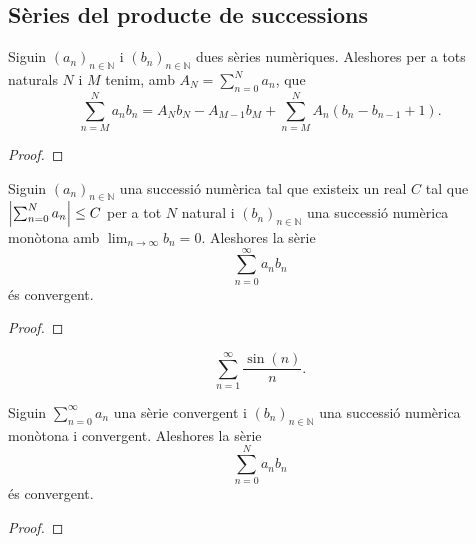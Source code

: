 \documentclass[../Apunts.tex]{subfiles}
\begin{document}
	\subsection{Sèries del producte de successions}
	\begin{lemma}
		\label{lema:fórmula de sumació d'Abel}
		Siguin \((a_{n})_{n\in\mathbb{N}}\) i \((b_{n})_{n\in\mathbb{N}}\) dues sèries numèriques. Aleshores per a tots naturals \(N\) i \(M\) tenim, amb \(A_{N}=\sum_{n=0}^{N}a_{n}\), que
		\[\sum_{n=M}^{N}a_{n}b_{n}=A_{N}b_{N}-A_{M-1}b_{M}+\sum_{n=M}^{N}A_{n}(b_{n}-b_{n-1}+1).\]
		\begin{proof}
		\end{proof}
	\end{lemma}
	\begin{theorem}
		\label{thm:Teorema de Dirichlet per sèries numèriques}
		Siguin \((a_{n})_{n\in\mathbb{N}}\) una successió numèrica tal que existeix un real \(C\) tal que \(\abs{\sum_{n=0}^{N}a_{n}}\leq C\) per a tot \(N\) natural i \((b_{n})_{n\in\mathbb{N}}\) una successió numèrica monòtona amb \(\lim_{n\to\infty}b_{n}=0\). Aleshores la sèrie
		\[\sum_{n=0}^{\infty}a_{n}b_{n}\]
		és convergent.
		\begin{proof}
		\end{proof}
	\end{theorem}
	\begin{example}
		\[\sum_{n=1}^{\infty}\frac{\sin(n)}{n}.\]
		\begin{solution}
		\end{solution}
	\end{example}
	\begin{theorem}
		\label{thm:Criteri d'Abel}
		Siguin \(\sum_{n=0}^{\infty}a_{n}\) una sèrie convergent i \((b_{n})_{n\in\mathbb{N}}\) una successió numèrica monòtona i convergent. Aleshores la sèrie
		\[\sum_{n=0}^{N}a_{n}b_{n}\]
		és convergent.
		\begin{proof}
		\end{proof}
	\end{theorem}	
\end{document}
